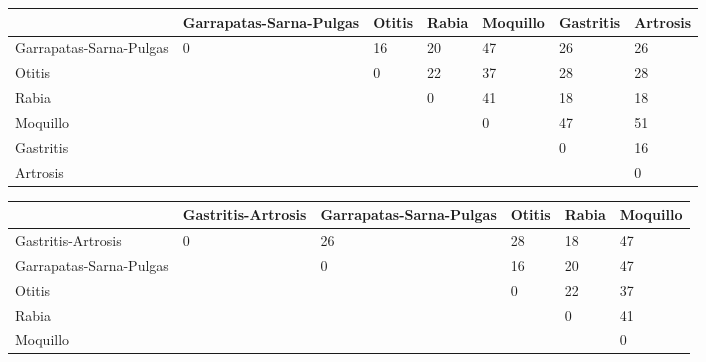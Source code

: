 \documentclass[a4paper,table,xcdraw]{article}
\begin{document}
\begin{longtable}{|l|l|l|l|l|l|l|}
\hline
                        & Garrapatas-Sarna-Pulgas & Otitis & Rabia & Moquillo & Gastritis & Artrosis \\ \hline
\endhead
%
Garrapatas-Sarna-Pulgas & 0                       & 16     & 20    & 47       & 26        & 26       \\ \hline
Otitis                  &                         & 0      & 22    & 37       & 28        & 28       \\ \hline
Rabia                   &                         &        & 0     & 41       & 18        & 18       \\ \hline
Moquillo                &                         &        &       & 0        & 47        & 51       \\ \hline
Gastritis               &                         &        &       &          & 0         & 16       \\ \hline
Artrosis                &                         &        &       &          &           & 0        \\ \hline
\end{longtable}

\begin{longtable}{|l|l|l|l|l|l|}
\hline
                        & Gastritis-Artrosis & Garrapatas-Sarna-Pulgas & Otitis & Rabia & Moquillo \\ \hline
\endhead
%
Gastritis-Artrosis      & 0                  & 26                      & 28     & 18    & 47       \\ \hline
Garrapatas-Sarna-Pulgas &                    & 0                       & 16     & 20    & 47       \\ \hline
Otitis                  &                    &                         & 0      & 22    & 37       \\ \hline
Rabia                   &                    &                         &        & 0     & 41       \\ \hline
Moquillo                &                    &                         &        &       & 0        \\ \hline
\end{longtable}
\end{document}
